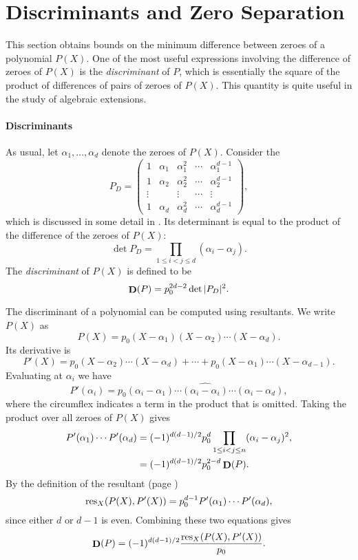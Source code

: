 \section{Discriminants and Zero Separation}
\label{PB:RootSeparate:Sec}

This section obtains bounds on the minimum difference between zeroes of a
polynomial $P(X)$.  One of the most useful expressions involving the
difference of zeroes of $P(X)$ is the {\em discriminant} of $P$, which
is essentially the square of the product of differences of pairs of
zeroes of $P(X)$.  This quantity is quite useful in the study of
algebraic extensions.

\paragraph{Discriminants}

As usual, let $\alpha_1, \ldots, \alpha_d$ denote the zeroes of
$P(X)$.   Consider the 
\[
P_D = 
\left(\begin{array}{ccccc}
1 & \alpha_1 & \alpha_1^2 & \cdots & \alpha_1^{d-1} \\
1 & \alpha_2 & \alpha_2^2 & \cdots & \alpha_2^{d-1} \\
\vdots & & \vdots & \cdots & \vdots \\
1 & \alpha_d & \alpha_d^2 & \cdots & \alpha_d^{d-1} 
\end{array}\right),
\]
which is discussed in some detail in
.  Its determinant is equal to the product of
the difference of the zeroes of $P(X)$:
\[
\det P_D = \prod_{1\le i < j \le d} ( \alpha_i - \alpha_j).
\]
The {\em discriminant} of $P(X)$ is defined to be
\begin{equation}\label{PB:Discriminant:Eq}
\mathop{\mathbf{D}}\nolimits(P) = p_0^{2d-2} \det|P_D|^2.
\end{equation}

The discriminant of a polynomial can be computed using
resultants.  We write $P(X)$ as
\[
P(X) = p_0 (X - \alpha_1) (X - \alpha_2) \cdots (X - \alpha_d).
\]
Its derivative is
\[
P'(X) = p_0(X - \alpha_2) \cdots (X - \alpha_d) + \cdots + p_0(X - \alpha_1) \cdots (X -
\alpha_{d-1}).
\]
Evaluating at $\alpha_i$ we have
\[
P'(\alpha_i) = p_0(\alpha_i - \alpha_1) \cdots \widehat{(\alpha_i -
\alpha_i)} \cdots (\alpha_i - \alpha_d),
\]
where the circumflex indicates a term in the product that is omitted.
Taking the product over all zeroes of $P(X)$ gives
\[
\begin{aligned}
P'(\alpha_1) \cdots P'(\alpha_d) 
  & \displaystyle
    = (-1)^{d(d-1)/2} p_0^d \prod_{1\le i< j \le n}(\alpha_i - \alpha_j)^2,\\
  & \displaystyle
    = (-1)^{d(d-1)/2} p_0^{2-d} \mathop{\mathbf{D}}\nolimits(P).
\end{aligned}
\]
By the definition of the resultant  
(page \pageref{Resultant:Def:Eq})
\[
\mathop{\rm res}\nolimits_X (P(X), P'(X)) = p_0^{d-1}P'(\alpha_1) \cdots
P'(\alpha_d),
\]
since either $d$ or $d-1$ is even.  Combining these two equations gives
\[
\mathop{\mathbf{D}}\nolimits(P) = (-1)^{d(d-1)/2} \frac{\mathop{\rm res}\nolimits_X (P(X), P'(X))}{p_0}.
\]

